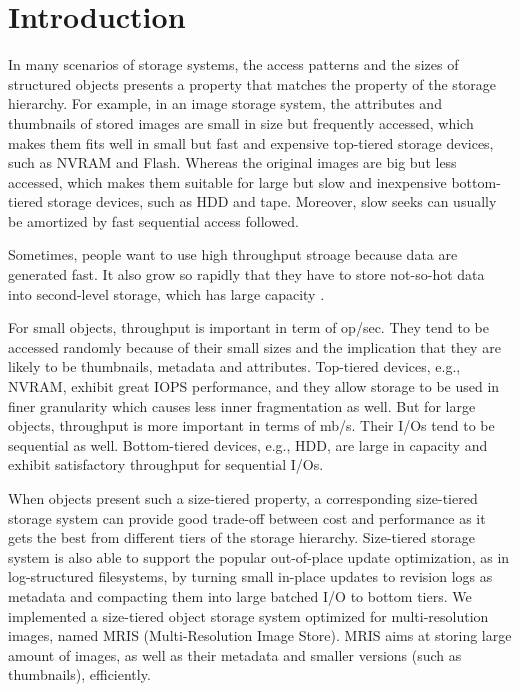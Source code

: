 \section{Introduction}
\label{intro}

In many scenarios of storage systems, the access patterns and the
sizes of structured objects presents a property that matches the
property of the storage hierarchy. For example, in an image storage
system, the attributes and thumbnails of stored images are small in
size but frequently accessed, which makes them fits well in small but
fast and expensive top-tiered storage devices, such as NVRAM and
Flash.  Whereas the original images are big but less accessed, which
makes them suitable for large but slow and inexpensive bottom-tiered
storage devices, such as HDD and tape.  Moreover, slow seeks can
usually be amortized by fast sequential access followed.

Sometimes, people want to use high throughput stroage because data
are generated fast. It also grow so rapidly that they have to store
not-so-hot data into second-level storage, which has large capacity
\cite{level_lifetime}.

For small objects, throughput is important in term of op/sec. They
tend to be accessed randomly because of their small sizes and the
implication that they are likely to be thumbnails, metadata and
attributes.  Top-tiered devices, e.g., NVRAM, exhibit great IOPS
performance, and they allow storage to be used in finer granularity
which causes less inner fragmentation as well. But for large objects,
throughput is more important in terms of mb/s. Their I/Os tend to be
sequential as well. Bottom-tiered devices, e.g., HDD, are large in
capacity and exhibit satisfactory throughput for sequential I/Os. 

When objects present such a size-tiered property, a corresponding
size-tiered storage system can provide good trade-off between cost and
performance as it gets the best from different tiers of the storage
hierarchy. Size-tiered storage system is also able to support the
popular out-of-place update optimization, as in log-structured
filesystems, by turning small in-place updates to revision logs as
metadata and compacting them into large batched I/O to bottom tiers.
We implemented a size-tiered object storage system optimized for
multi-resolution images, named MRIS (Multi-Resolution Image Store).
MRIS aims at storing large amount of images, as well as their metadata
and smaller versions (such as thumbnails), efficiently. 

